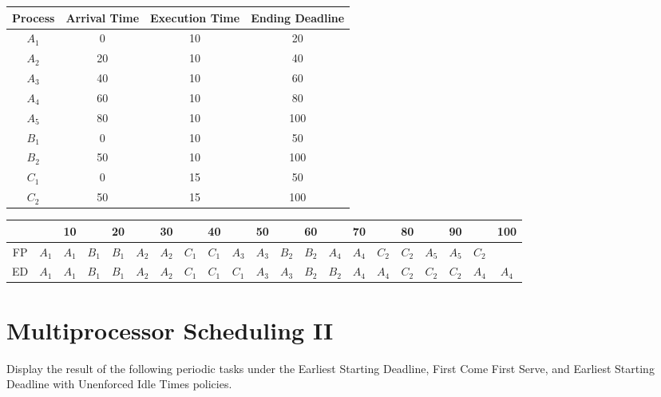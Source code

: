 \documentclass{article}
\begin{document}
\vspace{0.5cm}
\begin{center}
\begin{tabular}{|c|c|c|c|}
\hline
Process & Arrival Time & Execution Time & Ending Deadline\\
\hline
$A_{1}$ & 0 & 10 & 20\\
$A_{2}$ & 20 & 10 & 40\\
$A_{3}$ & 40 & 10 & 60\\
$A_{4}$ & 60 & 10 & 80\\
$A_{5}$ & 80 & 10 & 100\\
\hline
$B_{1}$ & 0 & 10 & 50\\
$B_{2}$ & 50 & 10 & 100\\
\hline
$C_{1}$ & 0 & 15 & 50\\
$C_{2}$ & 50 & 15 & 100\\
\hline
\end{tabular}

\vspace{0.5cm}
\begin{tabular}{c|c:c:c:c:c:c:c:c:c:c:c:c:c:c:c:c:c:c:c:c:}
&  & 10 & & 20 & & 30 & & 40 & & 50 & & 60 & & 70 & & 80 & & 90 & & 100\\
\hline
FP & $A_{1}$ & $A_{1}$ & $B_{1}$ & $B_{1}$ & $A_{2}$ & $A_{2}$ & $C_{1}$ & $C_{1}$ & $A_{3}$ & $A_{3}$ & $B_{2}$ & $B_{2}$ & $A_{4}$ & $A_{4}$ & $C_{2}$ & $C_{2}$ & $A_{5}$ & $A_{5}$ & $C_{2}$ & \\
\hline
ED & $A_{1}$ & $A_{1}$ & $B_{1}$ & $B_{1}$ & $A_{2}$ & $A_{2}$ & $C_{1}$ & $C_{1}$ & $C_{1}$ & $A_{3}$ & $A_{3}$ & $B_{2}$ & $B_{2}$ & $A_{4}$ & $A_{4}$ & $C_{2}$ & $C_{2}$ & $C_{2}$ & $A_{4}$ & $A_{4}$\\
\hline
\end{tabular}
\end{center}
\newpage



\section{Multiprocessor Scheduling II}
Display the result of the following periodic tasks under the Earliest Starting Deadline,
First Come First Serve, and Earliest Starting Deadline with Unenforced Idle Times policies.
\end{document}
